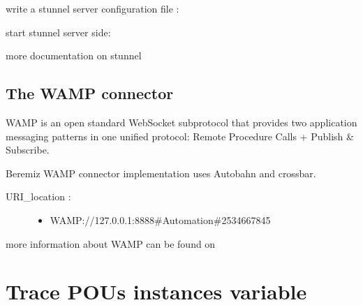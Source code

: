 \documentclass[letterpaper,10pt,english]{sphinxmanual}
\begin{document}
write a stunnel server  configuration file :

%
\begin{sphinxVerbatim}[commandchars=\\\{\}]
  

\PYG{p}{[}\PYG{p}{]}
  
  
  
\end{sphinxVerbatim}

start stunnel server side:

%
\begin{sphinxVerbatim}[commandchars=\\\{\}]
 
\end{sphinxVerbatim}

more documentation on stunnel 


\subsection{The WAMP connector}
\label{\detokenize{manual/connectors:the-wamp-connector}}
WAMP is an open standard WebSocket subprotocol that provides two application messaging
patterns in one unified protocol: Remote Procedure Calls + Publish \& Subscribe.

Beremiz WAMP connector implementation uses Autobahn and crossbar.
\begin{description}
\item[{URI\_location :}] \leavevmode\begin{itemize}
\item {} 
WAMP://127.0.0.1:8888\#Automation\#2534667845

\end{itemize}

\end{description}

more information about WAMP can be found on 


\section{Trace POUs instances variable}
\label{\detokenize{manual/debug:trace-pous-instances-variable}}\label{\detokenize{manual/debug::doc}}
\end{document}
